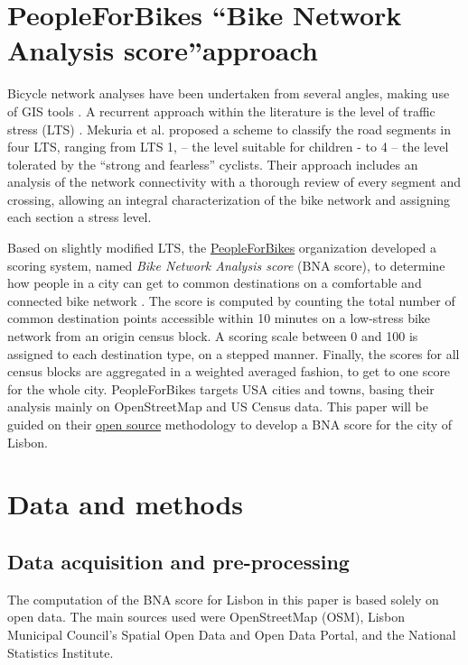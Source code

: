 \documentclass[information,article,submit,moreauthors,pdftex,10pt,a4paper]{mdpi}
\theoremstyle{mdpi}
\newcounter{ex}
\newcounter{re}
\theoremstyle{mdpidefinition}
\begin{document}
\section{PeopleForBikes \textquotedblleft Bike Network Analysis score\textquotedblright approach} \label{pfb}

Bicycle network analyses have been undertaken from several angles, making use of GIS tools \cite{Manum2013,Cooper2017}. A recurrent approach within the literature is the level of traffic stress (LTS) \cite{Sorton1994,Geller2006}. Mekuria et al. \cite{Mekuria2012b} proposed a scheme to classify the road segments in four LTS, ranging from LTS 1, – the level suitable for children - to 4 – the level tolerated by the “strong and fearless” cyclists. Their approach includes an analysis of the network connectivity with a thorough review of every segment and crossing, allowing an integral characterization of the bike network and assigning each section a stress level. 

Based on slightly modified LTS, the \href{https://peopleforbikes.org/}{PeopleForBikes} organization developed a scoring system, named \textit{Bike Network Analysis score} (BNA score), to determine how people in a city can get to common destinations on a comfortable and connected bike network \cite{PeopleforBikes2014}. The score is computed by counting the total number of common destination points accessible within 10 minutes on a low-stress bike network from an origin census block. A scoring scale between 0 and 100 is assigned to each destination type, on a stepped manner. Finally, the scores for all census blocks are aggregated in a weighted averaged fashion, to get to one score for the whole city. PeopleForBikes targets USA cities and towns, basing their analysis mainly on OpenStreetMap and US Census data. This paper will be guided on their \href{https://github.com/azavea/pfb-network-connectivity}{open source} methodology to develop a BNA score for the city of Lisbon.

\section{Data and methods} \label {methods}

\subsection{Data acquisition and pre-processing} \label{data}

The computation of the BNA score for Lisbon in this paper is based solely on open data. The main sources used were OpenStreetMap (OSM), Lisbon Municipal Council's Spatial Open Data and Open Data Portal, and the National Statistics Institute. 
\end{document}
